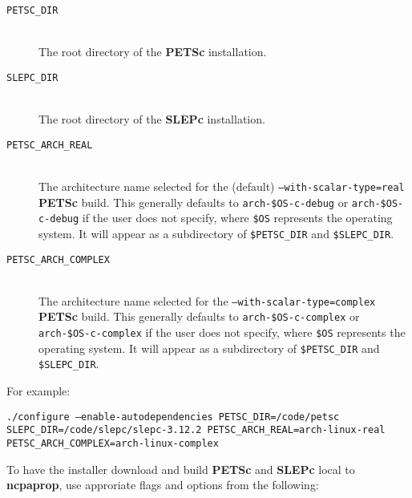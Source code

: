 \begin{description}
\item[\texttt{PETSC\_DIR}]\hfill \\
\noindent
The root directory of the \textbf{PETSc} installation.

\item[\texttt{SLEPC\_DIR}]\hfill \\
\noindent
The root directory of the \textbf{SLEPc} installation.

\item[\texttt{PETSC\_ARCH\_REAL}]\hfill \\
\noindent
The architecture name selected for the (default) \texttt{--with-scalar-type=real} \textbf{PETSc} build.  This generally defaults to \texttt{arch-\$OS-c-debug} or \texttt{arch-\$OS-c-debug} if the user does not specify, where \texttt{\$OS} represents the operating system.  It will appear as a subdirectory of \texttt{\$PETSC\_DIR} and \texttt{\$SLEPC\_DIR}.

\item[\texttt{PETSC\_ARCH\_COMPLEX}]\hfill \\
\noindent
The architecture name selected for the \texttt{--with-scalar-type=complex} \textbf{PETSc} build.  This generally defaults to \texttt{arch-\$OS-c-complex} or \texttt{arch-\$OS-c-complex} if the user does not specify, where \texttt{\$OS} represents the operating system.  It will appear as a subdirectory of \texttt{\$PETSC\_DIR} and \texttt{\$SLEPC\_DIR}.
\end{description}

\noindent For example:

\noindent \texttt{./configure --enable-autodependencies PETSC\_DIR=/code/petsc SLEPC\_DIR=/code/slepc/slepc-3.12.2 PETSC\_ARCH\_REAL=arch-linux-real PETSC\_ARCH\_COMPLEX=arch-linux-complex}

\noindent To have the installer download and build \textbf{PETSc} and \textbf{SLEPc} local to \textbf{ncpaprop}, use approriate flags and options from the following:

